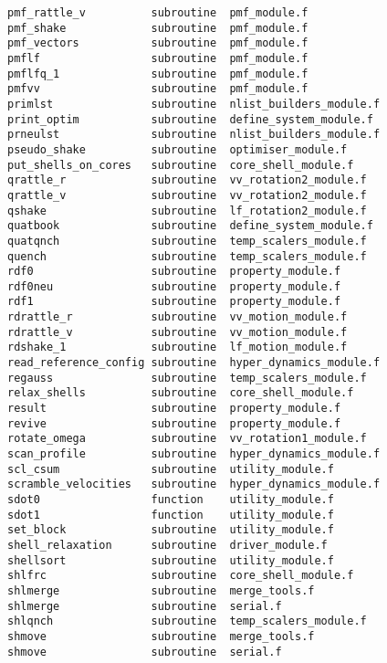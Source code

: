 \begin{verbatim}
pmf_rattle_v          subroutine  pmf_module.f              
pmf_shake             subroutine  pmf_module.f              
pmf_vectors           subroutine  pmf_module.f              
pmflf                 subroutine  pmf_module.f              
pmflfq_1              subroutine  pmf_module.f              
pmfvv                 subroutine  pmf_module.f              
primlst               subroutine  nlist_builders_module.f   
print_optim           subroutine  define_system_module.f    
prneulst              subroutine  nlist_builders_module.f   
pseudo_shake          subroutine  optimiser_module.f        
put_shells_on_cores   subroutine  core_shell_module.f       
qrattle_r             subroutine  vv_rotation2_module.f     
qrattle_v             subroutine  vv_rotation2_module.f     
qshake                subroutine  lf_rotation2_module.f     
quatbook              subroutine  define_system_module.f    
quatqnch              subroutine  temp_scalers_module.f     
quench                subroutine  temp_scalers_module.f     
rdf0                  subroutine  property_module.f         
rdf0neu               subroutine  property_module.f         
rdf1                  subroutine  property_module.f         
rdrattle_r            subroutine  vv_motion_module.f        
rdrattle_v            subroutine  vv_motion_module.f        
rdshake_1             subroutine  lf_motion_module.f        
read_reference_config subroutine  hyper_dynamics_module.f   
regauss               subroutine  temp_scalers_module.f     
relax_shells          subroutine  core_shell_module.f       
result                subroutine  property_module.f         
revive                subroutine  property_module.f         
rotate_omega          subroutine  vv_rotation1_module.f     
scan_profile          subroutine  hyper_dynamics_module.f   
scl_csum              subroutine  utility_module.f          
scramble_velocities   subroutine  hyper_dynamics_module.f   
sdot0                 function    utility_module.f          
sdot1                 function    utility_module.f          
set_block             subroutine  utility_module.f          
shell_relaxation      subroutine  driver_module.f           
shellsort             subroutine  utility_module.f          
shlfrc                subroutine  core_shell_module.f       
shlmerge              subroutine  merge_tools.f             
shlmerge              subroutine  serial.f                  
shlqnch               subroutine  temp_scalers_module.f     
shmove                subroutine  merge_tools.f             
shmove                subroutine  serial.f                  

\end{verbatim}
